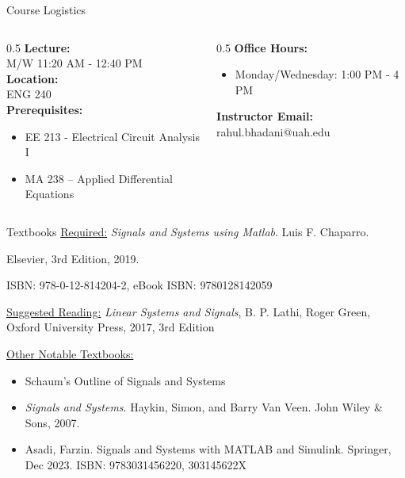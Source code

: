 \documentclass[aspectratio=169,xcolor=dvipsnames,svgnames,x11names,fleqn]{beamer}
\begin{document}
\begin{frame}{Course Logistics}
    \begin{columns}[T] %
    \begin{column}{0.5\textwidth}
        \textbf{Lecture:} \\
        M/W 11:20 AM - 12:40 PM \\
        \vspace{0.3cm}
        \textbf{Location:} \\
        ENG 240 \\
        \vspace{0.3cm}
        \textbf{Prerequisites:}
        \begin{itemize}
        \item EE 213 - Electrical Circuit Analysis I
        \item MA 238 – Applied Differential Equations
        \end{itemize}
    \end{column}
    \begin{column}{0.5\textwidth}
        \textbf{Office Hours:}
        \begin{itemize}
        \item Monday/Wednesday: 1:00 PM - 4 PM
        \end{itemize}
        \textbf{Instructor Email:} rahul.bhadani@uah.edu
    \end{column}
    \end{columns}
\end{frame}

\begin{frame}{Textbooks}
    \underline{Required:} \emph{\color{DarkGreen}Signals and Systems using Matlab}. Luis F. Chaparro. \par{\color{DarkRed}Elsevier, 3rd Edition, 2019}. \par ISBN: 978-0-12-814204-2, eBook ISBN: 9780128142059\par\vspace{5pt}

        \underline{Suggested Reading:} \textit{Linear Systems and Signals}, B. P. Lathi, Roger Green, Oxford University Press, 2017, 3rd Edition

        \underline{Other Notable Textbooks:}
        \begin{itemize}
            \item Schaum's Outline of Signals and Systems
            \item \textit{Signals and Systems}. Haykin, Simon, and Barry Van Veen. John Wiley \& Sons, 2007.
            \item Asadi, Farzin. Signals and Systems with MATLAB and Simulink. Springer, Dec 2023. ISBN: 9783031456220, 303145622X
        \end{itemize}
\end{frame}
\end{document}
